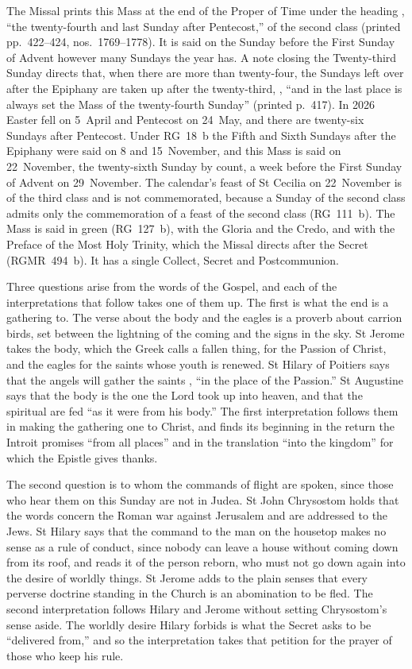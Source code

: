 The Missal prints this Mass at the end of the Proper of Time under the
heading , ``the
twenty-fourth and last Sunday after Pentecost,'' of the second class (printed
pp.~422--424, nos.~1769--1778). It is said on the Sunday before the First
Sunday of Advent however many Sundays the year has. A note closing the
Twenty-third Sunday directs that, when there are more than twenty-four, the
Sundays left over after the Epiphany are taken up after the twenty-third,
, ``and in the last
place is always set the Mass of the twenty-fourth Sunday'' (printed p.~417).
In 2026 Easter fell on 5~April and Pentecost on 24~May, and there are
twenty-six Sundays after Pentecost. Under RG~18~b the Fifth and Sixth Sundays
after the Epiphany were said on 8 and 15~November, and this Mass is said on
22~November, the twenty-sixth Sunday by count, a week before the First Sunday
of Advent on 29~November. The calendar's feast of St Cecilia on 22~November is
of the third class and is not commemorated, because a Sunday of the second
class admits only the commemoration of a feast of the second class
(RG~111~b). The Mass is said in green (RG~127~b), with the Gloria and the
Credo, and with the Preface of the Most Holy Trinity, which the Missal directs
after the Secret (RGMR~494~b). It has a single Collect, Secret and
Postcommunion.

Three questions arise from the words of the Gospel, and each of the
interpretations that follow takes one of them up. The first is what the end is
a gathering to. The verse about the body and the eagles is a proverb about
carrion birds, set between the lightning of the coming and the signs in the
sky. St Jerome takes the body, which the Greek calls a fallen thing, for the
Passion of Christ, and the eagles for the saints whose youth is renewed. St
Hilary of Poitiers says that the angels will gather the saints , ``in the place of the Passion.'' St Augustine says that the body is
the one the Lord took up into heaven, and that the spiritual are fed ``as it
were from his body.'' The first interpretation follows them in making the
gathering one to Christ, and finds its beginning in the return the Introit
promises ``from all places'' and in the translation ``into the kingdom'' for
which the Epistle gives thanks.

The second question is to whom the commands of flight are spoken, since
those who hear them on this Sunday are not in Judea. St John Chrysostom
holds that the words concern the Roman war against Jerusalem and are
addressed to the Jews. St Hilary says
that the command to the man on the housetop makes no sense as a rule of
conduct, since nobody can leave a house without coming down from its roof, and
reads it of the person reborn, who must not go down again into the desire of
worldly things. St Jerome adds to the plain senses that every perverse
doctrine standing in the Church is an abomination to be fled. The second
interpretation follows Hilary and Jerome without setting Chrysostom's sense
aside. The worldly desire Hilary forbids is what the Secret asks to be
``delivered from,'' and so the interpretation takes that petition for the
prayer of those who keep his rule.

